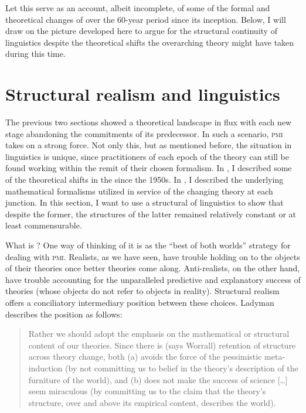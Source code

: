 \documentclass[output=paper]{langscibook}
\begin{document}
Let this serve as an account, albeit incomplete, of some of the formal and theoretical changes of  over the 60-year period since its inception. Below, I will draw on the picture developed here to argue for the structural continuity of linguistics despite the theoretical shifts the overarching theory might have taken during this time.

\section{Structural realism and linguistics}
\label{sec:nefdt:structuralrealism}

The previous two sections showed a theoretical landscape in flux with each new stage abandoning the commitments of its predecessor. In such a scenario, \textsc{pmi} takes on a strong force. Not only this, but as mentioned before, the situation in linguistics is unique, since practitioners of each epoch of the theory can still be found working within the remit of their chosen formalism. In , I described some of the theoretical shifts in the  since the 1950s. In , I described the underlying mathematical formalisms utilized in service of the changing theory at each junction. In this section, I want to use a structural  of linguistics to show that despite the former, the structures of the latter remained relatively constant or at least commensurable. 

What is ? One way of thinking of it is as the ``best of both worlds'' strategy for dealing with \textsc{pmi}. Realists, as we have seen, have trouble holding on to the objects of their theories once better theories come along. Anti-realists, on the other hand, have trouble accounting for the unparalleled predictive and explanatory success of theories (whose objects do not refer to objects in reality). Structural realism offers a conciliatory intermediary position between these choices. Ladyman describes the position as follows:

\begin{quote}
Rather we should adopt the  emphasis on the mathematical or structural content of our theories. Since there is (says Worrall) retention of structure across theory change,  both (a) avoids the force of the pessimistic meta-induction (by not committing us to belief in the theory's description of the furniture of the world), and (b) does not make the success of science […] seem miraculous (by committing us to the claim that the theory's structure, over and above its empirical content, describes the world). \citep[410]{Ladyman1998}
\end{quote}
\end{document}
